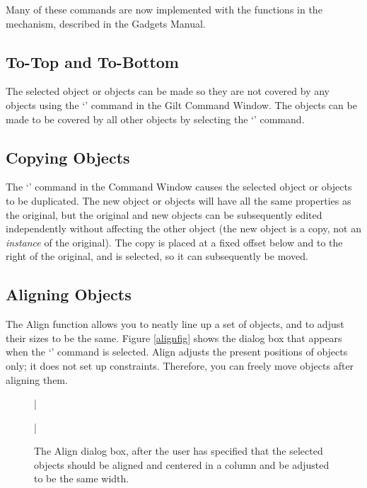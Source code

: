 Many of these commands are now implemented with the functions in the
 mechanism, described in the Gadgets Manual.


\subsection{To-Top and To-Bottom}
\label{to-top}

The selected object or objects can be made so they are not covered by
any objects using
the `' command in the Gilt Command Window.  The objects can be
made to be covered by all other objects by selecting the `' command.


\subsection{Copying Objects}
\label{duplicating-objects}

The `' command in the Command Window causes the selected
object or objects to
be duplicated.  The new object or objects will have all the same
properties as the
original, but the original and new objects can be subsequently edited
independently without affecting the other object
(the new object is a copy, not an {\it instance} of
the original).  The copy is placed at a fixed offset below and to the right
of the original, and is selected, so it can subsequently be moved.


\subsection{Aligning Objects}
\label{align}


The Align function allows you to neatly line up a set of objects, and
to adjust their sizes to be the same.  Figure \ref{alignfig} shows the
dialog box that appears when the `' command is selected.  Align
adjusts the present positions of objects only; it does not set up
constraints.  Therefore, you can freely move objects after aligning them.

\begin{figure}
\bar{}
\begin{center}
\end{center}
\caption{The Align dialog box, after the user has specified that
the selected objects should be aligned and centered in a column and be
adjusted to be the same width.}
\bar{}
\end{figure}

